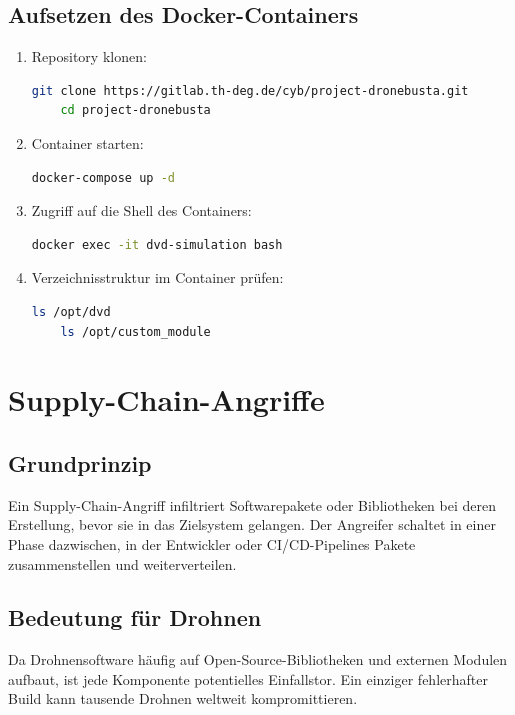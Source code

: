 \documentclass[a4paper,12pt]{report}
\begin{document}
\section{Aufsetzen des Docker-Containers}
\begin{enumerate}
  \item Repository klonen:
    \begin{lstlisting}[language=bash]
    git clone https://gitlab.th-deg.de/cyb/project-dronebusta.git
    cd project-dronebusta
    \end{lstlisting}
  \item Container starten:
    \begin{lstlisting}[language=bash]
    docker-compose up -d
    \end{lstlisting}
  \item Zugriff auf die Shell des Containers:
    \begin{lstlisting}[language=bash]
    docker exec -it dvd-simulation bash
    \end{lstlisting}
  \item Verzeichnisstruktur im Container prüfen:
    \begin{lstlisting}[language=bash]
    ls /opt/dvd
    ls /opt/custom_module
    \end{lstlisting}
\end{enumerate}

\chapter{Supply-Chain-Angriffe}
\section{Grundprinzip}
Ein Supply-Chain-Angriff infiltriert Softwarepakete oder Bibliotheken bei deren Erstellung, bevor sie in das Zielsystem gelangen. Der Angreifer schaltet in einer Phase dazwischen, in der Entwickler oder CI/CD-Pipelines Pakete zusammenstellen und weiterverteilen.

\section{Bedeutung für Drohnen}
Da Drohnensoftware häufig auf Open-Source-Bibliotheken und externen Modulen aufbaut, ist jede Komponente potentielles Einfallstor. Ein einziger fehlerhafter Build kann tausende Drohnen weltweit kompromittieren.
\end{document}
